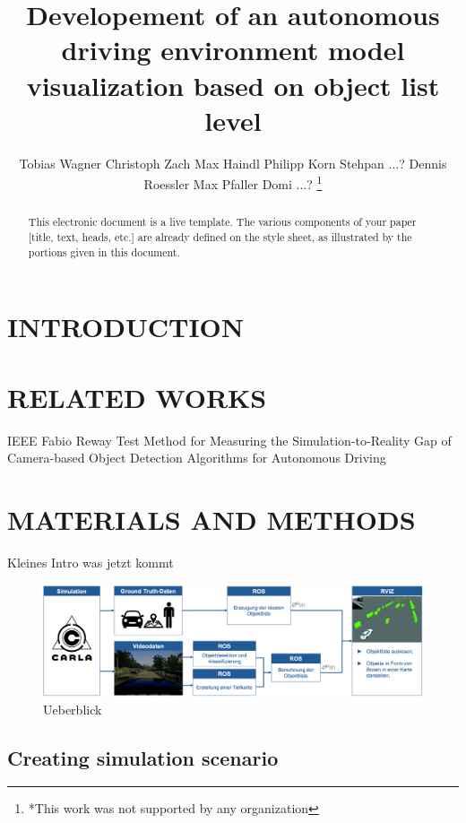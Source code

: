 \documentclass[letterpaper, 10 pt, conference]{ieeeconf}  %
\title{\LARGE \bf
Developement of an autonomous driving environment model visualization based on object list level
}
\author{Tobias Wagner  Christoph Zach Max Haindl Philipp Korn Stehpan ...? Dennis Roessler Max Pfaller Domi ...? %
\thanks{*This work was not supported by any organization}%

}
\begin{document}
\maketitle
\thispagestyle{empty}
\pagestyle{empty}


\begin{abstract}

This electronic document is a live template. The various components of your paper [title, text, heads, etc.] are already defined on the style sheet, as illustrated by the portions given in this document.

\end{abstract}


\section{INTRODUCTION}


\section{RELATED WORKS}

IEEE Fabio Reway Test Method for Measuring the Simulation-to-Reality Gap of Camera-based Object Detection Algorithms for Autonomous Driving


\section{MATERIALS AND METHODS}

Kleines Intro was jetzt kommt


\begin{figure}[thpb]
      \centering
       \includegraphics[scale=0.17]{Ueberblick}
      \caption{Ueberblick }
      \label{figurelabel}
   \end{figure}
\subsection{Creating simulation scenario}
\end{document}
